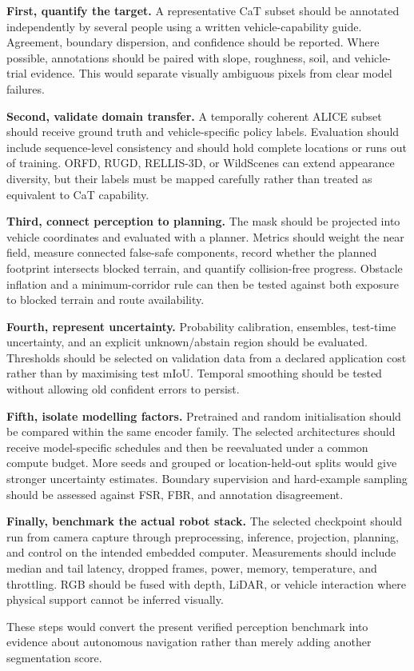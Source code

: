 \textbf{First, quantify the target.} A representative CaT subset should be
annotated independently by several people using a written vehicle-capability
guide. Agreement, boundary dispersion, and confidence should be reported.
Where possible, annotations should be paired with slope, roughness, soil, and
vehicle-trial evidence. This would separate visually ambiguous pixels from
clear model failures.

\textbf{Second, validate domain transfer.} A temporally coherent ALICE subset
should receive ground truth and vehicle-specific policy labels. Evaluation
should include sequence-level consistency and should hold complete locations
or runs out of training. ORFD, RUGD, RELLIS-3D, or WildScenes can extend
appearance diversity, but their labels must be mapped carefully rather than
treated as equivalent to CaT capability.

\textbf{Third, connect perception to planning.} The mask should be projected
into vehicle coordinates and evaluated with a planner. Metrics should weight
the near field, measure connected false-safe components, record whether the
planned footprint intersects blocked terrain, and quantify collision-free
progress. Obstacle inflation and a minimum-corridor rule can then be tested
against both exposure to blocked terrain and route availability.

\textbf{Fourth, represent uncertainty.} Probability calibration, ensembles,
test-time uncertainty, and an explicit unknown/abstain region should be
evaluated. Thresholds should be selected on validation data from a declared
application cost rather than by maximising test mIoU. Temporal smoothing should
be tested without allowing old confident errors to persist.

\textbf{Fifth, isolate modelling factors.} Pretrained and random initialisation
should be compared within the same encoder family. The selected architectures
should receive model-specific schedules and then be reevaluated under a common
compute budget. More seeds and grouped or location-held-out splits would give
stronger uncertainty estimates. Boundary supervision and hard-example sampling
should be assessed against FSR, FBR, and annotation disagreement.

\textbf{Finally, benchmark the actual robot stack.} The selected checkpoint
should run from camera capture through preprocessing, inference, projection,
planning, and control on the intended embedded computer. Measurements should
include median and tail latency, dropped frames, power, memory, temperature,
and throttling. RGB should be fused with depth, LiDAR, or vehicle interaction
where physical support cannot be inferred visually.

These steps would convert the present verified perception benchmark into
evidence about autonomous navigation rather than merely adding another
segmentation score.
